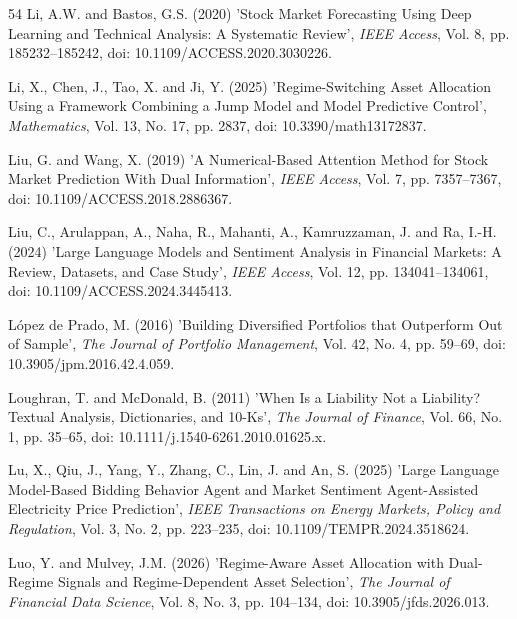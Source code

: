 \begin{thebibliography}{54}
Li, A.W. and Bastos, G.S. (2020) 'Stock Market Forecasting Using Deep Learning and Technical Analysis: A Systematic Review', {\it IEEE Access}, Vol. 8, pp. 185232--185242, doi: 10.1109/ACCESS.2020.3030226.

Li, X., Chen, J., Tao, X. and Ji, Y. (2025) 'Regime-Switching Asset Allocation Using a Framework Combining a Jump Model and Model Predictive Control', {\it Mathematics}, Vol. 13, No. 17, pp. 2837, doi: 10.3390/math13172837.

Liu, G. and Wang, X. (2019) 'A Numerical-Based Attention Method for Stock Market Prediction With Dual Information', {\it IEEE Access}, Vol. 7, pp. 7357--7367, doi: 10.1109/ACCESS.2018.2886367.

Liu, C., Arulappan, A., Naha, R., Mahanti, A., Kamruzzaman, J. and Ra, I.-H. (2024) 'Large Language Models and Sentiment Analysis in Financial Markets: A Review, Datasets, and Case Study', {\it IEEE Access}, Vol. 12, pp. 134041--134061, doi: 10.1109/ACCESS.2024.3445413.

L\'opez de Prado, M. (2016) 'Building Diversified Portfolios that Outperform Out of Sample', {\it The Journal of Portfolio Management}, Vol. 42, No. 4, pp. 59--69, doi: 10.3905/jpm.2016.42.4.059.

Loughran, T. and McDonald, B. (2011) 'When Is a Liability Not a Liability? Textual Analysis, Dictionaries, and 10-Ks', {\it The Journal of Finance}, Vol. 66, No. 1, pp. 35--65, doi: 10.1111/j.1540-6261.2010.01625.x.

Lu, X., Qiu, J., Yang, Y., Zhang, C., Lin, J. and An, S. (2025) 'Large Language Model-Based Bidding Behavior Agent and Market Sentiment Agent-Assisted Electricity Price Prediction', {\it IEEE Transactions on Energy Markets, Policy and Regulation}, Vol. 3, No. 2, pp. 223--235, doi: 10.1109/TEMPR.2024.3518624.

Luo, Y. and Mulvey, J.M. (2026) 'Regime-Aware Asset Allocation with Dual-Regime Signals and Regime-Dependent Asset Selection', {\it The Journal of Financial Data Science}, Vol. 8, No. 3, pp. 104--134, doi: 10.3905/jfds.2026.013.


\end{thebibliography}
